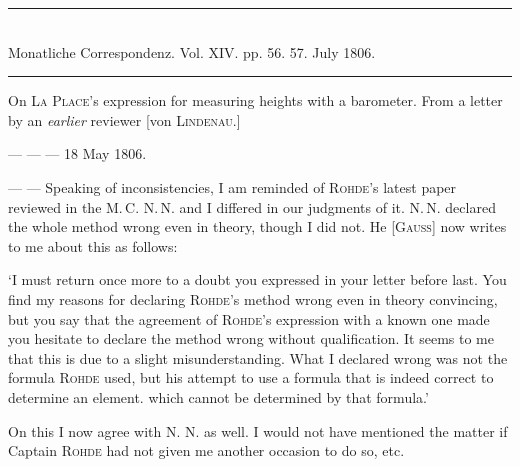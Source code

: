 \clearpage
{}
\hypertarget{native-490-lower}{}
\label{native-490-lower}
\begin{center}
\rule{0.55\linewidth}{0.4pt}\\[2pt]
Monatliche Correspondenz. Vol. XIV. pp. 56. 57. July 1806.\\[2pt]
\rule{0.55\linewidth}{0.4pt}
\end{center}

\begin{center}
On \textsc{La Place}’s expression for measuring heights with a barometer. From a letter by an \emph{earlier} reviewer [von \textsc{Lindenau}.]
\end{center}

\begin{flushright}
--- --- --- 18 May 1806.
\end{flushright}

--- --- Speaking of inconsistencies, I am reminded of \textsc{Rohde}’s latest paper reviewed in the M.\,C. N.\,N. and I differed in our judgments of it. N.\,N. declared the whole method wrong even in theory, though I did not. He [\textsc{Gauss}] now writes to me about this as follows:

‘I must return once more to a doubt you expressed in your letter before last. You find my reasons for declaring \textsc{Rohde}’s method wrong even in theory convincing, but you say that the agreement of \textsc{Rohde}’s expression with a known one made you hesitate to declare the method wrong without qualification.
It seems to me that this is due to a slight misunderstanding. What I declared wrong was not the formula \textsc{Rohde} used, but his attempt to use a formula that is indeed correct to determine an element. which cannot be determined by that formula.’

On this I now agree with N. N. as well. I would not have mentioned the matter if Captain \textsc{Rohde} had not given me another occasion to do so, etc.

